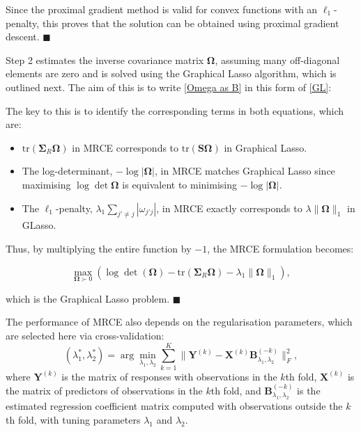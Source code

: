 Since the proximal gradient method is valid for convex functions with an \( \ell_1 \)-penalty, this proves that the solution can be obtained using proximal gradient descent. \( \blacksquare \)

Step 2 estimates the inverse covariance matrix \( \boldsymbol{\Omega} \), assuming many off-diagonal elements are zero and is solved using the Graphical Lasso algorithm, which is outlined next. The aim of this is to write \ref{Omega as B} in this form of \ref{GL}:

\noindent The key to this is to identify the corresponding terms in both equations, which are:
\begin{itemize}
    \item \(\text{tr} (\mathbf{\Sigma}_R \mathbf{\Omega})\) in MRCE corresponds to \(\text{tr}(\mathbf{S} \mathbf{\Omega})\) in Graphical Lasso.
    \item The log-determinant, \(-\log |\mathbf{\Omega}|\), in MRCE matches Graphical Lasso since maximising \(\log \det \mathbf{\Omega}\) is equivalent to minimising \(-\log |\mathbf{\Omega}|\).
    \item The \(\ell_1\)-penalty, \(\lambda_1 \sum_{j' \neq j} |\omega_{j'j}|\), in MRCE exactly corresponds to \(\lambda \|\mathbf{\Omega}\|_1\) in GLasso.
\end{itemize}

\noindent Thus, by multiplying the entire function by \(-1\), the MRCE formulation becomes:

\[
\max_{\mathbf{\Omega} \succ 0} \left( \log \det (\mathbf{\Omega}) - \text{tr}(\mathbf{\Sigma}_R \mathbf{\Omega}) - \lambda_1 \|\mathbf{\Omega}\|_1 \right),
\]

\noindent which is the Graphical Lasso problem. $\blacksquare$

\noindent The performance of MRCE also depends on the regularisation parameters, which are selected here via cross-validation:
\begin{equation*}
    (\lambda_1^*, \lambda_2^*) = \arg \min_{\lambda_1, \lambda_2} \sum_{k=1}^{K} \| \mathbf{Y}^{(k)} - \mathbf{X}^{(k)} \mathbf{B}_{\lambda_1, \lambda_2}^{(-k)} \|_F^2,
\end{equation*}
where \( \mathbf{Y}^{(k)} \) is the matrix of responses with observations in the \( k \)th fold, \( \mathbf{X}^{(k)} \) is the matrix of predictors of observations in the \( k \)th fold, and \( \mathbf{B}_{\lambda_1, \lambda_2}^{(-k)} \) is the estimated regression coefficient matrix computed with observations outside the \( k \)th fold, 
with tuning parameters \( \lambda_1 \) and \( \lambda_2 \).\cite{rothman2010sparse} 


